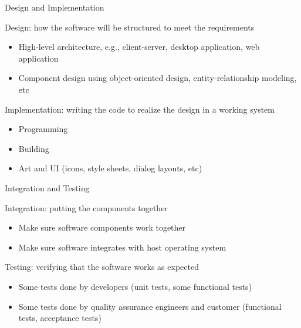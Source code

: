 \documentclass{beamer}
\begin{document}
\begin{frame}[fragile]{Design and Implementation}


Design: how the software will be structured to meet the requirements
\begin{itemize}
\item High-level architecture, e.g., client-server, desktop application, web application
\item Component design using object-oriented design, entity-relationship modeling, etc
\end{itemize}

Implementation: writing the code to realize the design in a working system
\begin{itemize}
\item Programming
\item Building
\item Art and UI (icons, style sheets, dialog layouts, etc)
\end{itemize}

\end{frame}

\begin{frame}[fragile]{Integration and Testing}


Integration: putting the components together
\begin{itemize}
\item Make sure software components work together
\item Make sure software integrates with host operating system
\end{itemize}

Testing: verifying that the software works as expected
\begin{itemize}
\item Some tests done by developers (unit tests, some functional tests)
\item Some tests done by quality assurance engineers and customer (functional tests, acceptance tests)
\end{itemize}


\end{frame}
\end{document}
